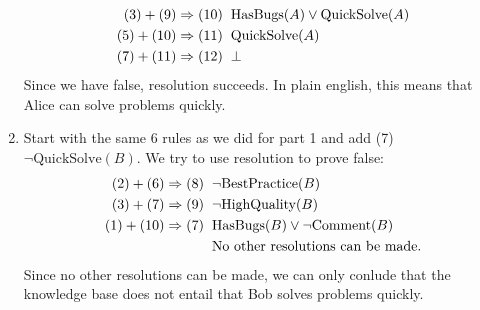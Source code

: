 \documentclass[10pt]{article}
\begin{document}
\begin{enumerate}
\begin{align*}
      (3) + (9) \Rightarrow (10) \hspace*{2mm}& \text{HasBugs}(A) \lor \text{QuickSolve}(A) \\
      (5) + (10) \Rightarrow (11) \hspace*{2mm}& \text{QuickSolve}(A) \\
      (7) + (11) \Rightarrow (12) \hspace*{2mm}& \bot 
    \end{align*}
    Since we have false, resolution succeeds. In plain english, this means that Alice can solve problems quickly.

    \item Start with the same 6 rules as we did for part 1 and add (7) \(\neg \text{QuickSolve}(B)\). We try to use resolution to prove false: 
    \begin{align*}
      (2) + (6) \Rightarrow (8) \hspace*{2mm}& \neg \text{BestPractice}(B) \\
      (3) + (7) \Rightarrow (9) \hspace*{2mm}& \neg \text{HighQuality}(B) \\
      (1) + (10) \Rightarrow (7) \hspace*{2mm}& \text{HasBugs}(B) \lor \neg \text{Comment}(B) \\
      & \text{No other resolutions can be made.}
    \end{align*}
    Since no other resolutions can be made, we can only conlude that the knowledge base does not entail that Bob solves problems quickly.
\end{enumerate}
\end{document}
